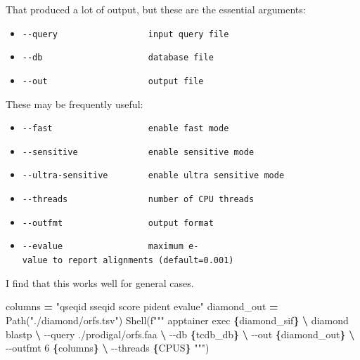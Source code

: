 \documentclass[
]{book}
\newenvironment{Shaded}{\begin{snugshade}}{\end{snugshade}}
\newcommand{\NormalTok}[1]{#1}
\newcommand{\OperatorTok}[1]{\textcolor[rgb]{0.81,0.36,0.00}{\textbf{#1}}}
\newcommand{\SpecialCharTok}[1]{\textcolor[rgb]{0.81,0.36,0.00}{\textbf{#1}}}
\newcommand{\SpecialStringTok}[1]{\textcolor[rgb]{0.31,0.60,0.02}{#1}}
\newcommand{\StringTok}[1]{\textcolor[rgb]{0.31,0.60,0.02}{#1}}
\providecommand{\tightlist}{%
  \setlength{\itemsep}{0pt}\setlength{\parskip}{0pt}}
\begin{document}
That produced a lot of output, but these are the essential arguments:

\begin{itemize}
\tightlist
\item
  \texttt{-\/-query\ \ \ \ \ \ \ \ \ \ \ \ \ \ \ \ \ \ input\ query\ file}
\item
  \texttt{-\/-db\ \ \ \ \ \ \ \ \ \ \ \ \ \ \ \ \ \ \ \ \ database\ file}
\item
  \texttt{-\/-out\ \ \ \ \ \ \ \ \ \ \ \ \ \ \ \ \ \ \ \ output\ file}
\end{itemize}

These may be frequently useful:

\begin{itemize}
\tightlist
\item
  \texttt{-\/-fast\ \ \ \ \ \ \ \ \ \ \ \ \ \ \ \ \ \ \ enable\ fast\ mode}
\item
  \texttt{-\/-sensitive\ \ \ \ \ \ \ \ \ \ \ \ \ \ enable\ sensitive\ mode}
\item
  \texttt{-\/-ultra-sensitive\ \ \ \ \ \ \ \ enable\ ultra\ sensitive\ mode}
\item
  \texttt{-\/-threads\ \ \ \ \ \ \ \ \ \ \ \ \ \ \ \ number\ of\ CPU\ threads}
\item
  \texttt{-\/-outfmt\ \ \ \ \ \ \ \ \ \ \ \ \ \ \ \ \ output\ format}
\item
  \texttt{-\/-evalue\ \ \ \ \ \ \ \ \ \ \ \ \ \ \ \ \ maximum\ e-value\ to\ report\ alignments\ (default=0.001)}
\end{itemize}

I find that this works well for general cases.

\begin{Shaded}
\begin{Highlighting}[numbers=left,,]
\NormalTok{columns }\OperatorTok{=} \StringTok{"qseqid sseqid score pident evalue"}
\NormalTok{diamond\_out }\OperatorTok{=}\NormalTok{ Path(}\StringTok{"./diamond/orfs.tsv"}\NormalTok{)}
\NormalTok{Shell(}\SpecialStringTok{f"""}
\SpecialStringTok{apptainer exec }\SpecialCharTok{\{}\NormalTok{diamond\_sif}\SpecialCharTok{\}}\SpecialStringTok{ }\OperatorTok{\textbackslash{}}
\SpecialStringTok{    diamond blastp }\OperatorTok{\textbackslash{}}
\SpecialStringTok{        {-}{-}query ./prodigal/orfs.faa }\OperatorTok{\textbackslash{}}
\SpecialStringTok{        {-}{-}db }\SpecialCharTok{\{}\NormalTok{tcdb\_db}\SpecialCharTok{\}}\SpecialStringTok{ }\OperatorTok{\textbackslash{}}
\SpecialStringTok{        {-}{-}out }\SpecialCharTok{\{}\NormalTok{diamond\_out}\SpecialCharTok{\}}\SpecialStringTok{ }\OperatorTok{\textbackslash{}}
\SpecialStringTok{        {-}{-}outfmt 6 }\SpecialCharTok{\{}\NormalTok{columns}\SpecialCharTok{\}}\SpecialStringTok{ }\OperatorTok{\textbackslash{}}
\SpecialStringTok{        {-}{-}threads }\SpecialCharTok{\{}\NormalTok{CPUS}\SpecialCharTok{\}}
\SpecialStringTok{"""}\NormalTok{)}
\end{Highlighting}
\end{Shaded}
\end{document}
